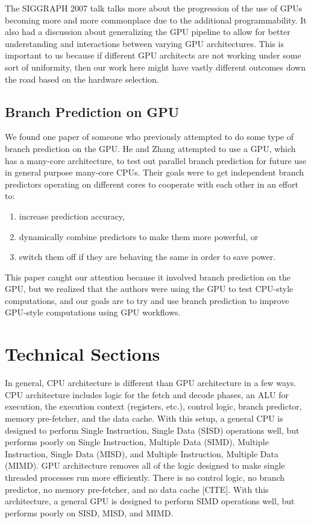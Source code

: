 \documentclass[conference]{IEEEtran}
\begin{document}
The SIGGRAPH 2007 talk \cite{Sig07} talks more about the progression of the use of GPUs becoming more and more commonplace due to the additional programmability.  It also had a discussion about generalizing the GPU pipeline to allow for better understanding and interactions between varying GPU architectures.  This is important to us because if different GPU architects are not working under some sort of uniformity, then our work here might have vastly different outcomes down the road based on the hardware selection.

\subsection{Branch Prediction on GPU}

We found one paper of someone who previously attempted to do some type of branch prediction on the GPU.  He and Zhang \cite{Zhang09} attempted to use a GPU, which has a many-core architecture, to test out parallel branch prediction for future use in general purpose many-core CPUs.  Their goals were to get independent branch predictors operating on different cores to cooperate with each other in an effort to:

\begin{enumerate}
	\item increase prediction accuracy,
	\item dynamically combine predictors to make them more powerful, or
	\item switch them off if they are behaving the same in order to save power.
\end{enumerate}

This paper caught our attention because it involved branch prediction on the GPU, but we realized that the authors were using the GPU to test CPU-style computations, and our goals are to try and use branch prediction to improve GPU-style computations using GPU workflows.

\section{Technical Sections}

In general, CPU architecture is different than GPU architecture in a few ways.  CPU architecture includes logic for the fetch and decode phases, an ALU for execution, the execution context (registers, etc.), control logic, branch predictor, memory pre-fetcher, and the data cache.  With this setup, a general CPU is designed to perform Single Instruction, Single Data (SISD) operations well, but performs poorly on Single Instruction, Multiple Data (SIMD), Multiple Instruction, Single Data (MISD), and Multiple Instruction, Multiple Data (MIMD).  GPU architecture removes all of the logic designed to make single threaded processes run more efficiently.  There is no control logic, no branch predictor, no memory pre-fetcher, and no data cache [CITE].  With this architecture, a general GPU is designed to perform SIMD operations well, but performs poorly on SISD, MISD, and MIMD. 
\end{document}
